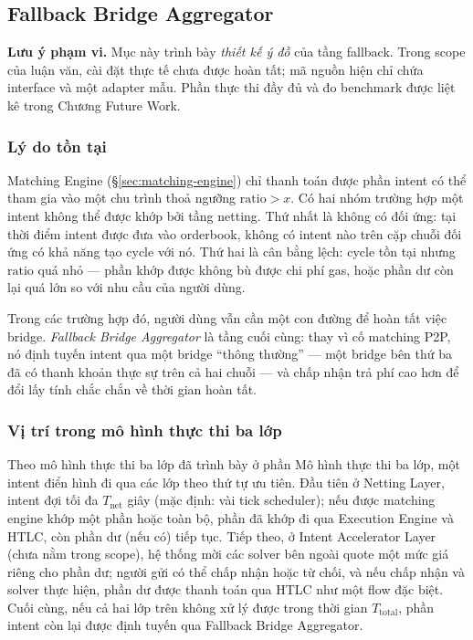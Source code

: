 
\subsection{Fallback Bridge Aggregator}
\label{sec:fallback-bridge}

\noindent\textbf{Lưu ý phạm vi.} Mục này trình bày \emph{thiết kế ý đồ} của tầng fallback. Trong scope của luận văn, cài đặt thực tế chưa được hoàn tất; mã nguồn hiện chỉ chứa interface và một adapter mẫu. Phần thực thi đầy đủ và đo benchmark được liệt kê trong Chương Future Work.

\subsubsection{Lý do tồn tại}

Matching Engine (\S\ref{sec:matching-engine}) chỉ thanh toán được phần intent có thể tham gia vào một chu trình thoả ngưỡng $\mathrm{ratio} > x$. Có hai nhóm trường hợp một intent không thể được khớp bởi tầng netting. Thứ nhất là không có đối ứng: tại thời điểm intent được đưa vào orderbook, không có intent nào trên cặp chuỗi đối ứng có khả năng tạo cycle với nó. Thứ hai là cân bằng lệch: cycle tồn tại nhưng $\mathrm{ratio}$ quá nhỏ — phần khớp được không bù được chi phí gas, hoặc phần dư còn lại quá lớn so với nhu cầu của người dùng.

Trong các trường hợp đó, người dùng vẫn cần một con đường để hoàn tất việc bridge. \emph{Fallback Bridge Aggregator} là tầng cuối cùng: thay vì cố matching P2P, nó định tuyến intent qua một bridge ``thông thường'' --- một bridge bên thứ ba đã có thanh khoản thực sự trên cả hai chuỗi --- và chấp nhận trả phí cao hơn để đổi lấy tính chắc chắn về thời gian hoàn tất.

\subsubsection{Vị trí trong mô hình thực thi ba lớp}

Theo mô hình thực thi ba lớp đã trình bày ở phần Mô hình thực thi ba lớp, một intent điển hình đi qua các lớp theo thứ tự ưu tiên. Đầu tiên ở Netting Layer, intent đợi tối đa $T_{\text{net}}$ giây (mặc định: vài tick scheduler); nếu được matching engine khớp một phần hoặc toàn bộ, phần đã khớp đi qua Execution Engine và HTLC, còn phần dư (nếu có) tiếp tục. Tiếp theo, ở Intent Accelerator Layer (chưa nằm trong scope), hệ thống mời các solver bên ngoài quote một mức giá riêng cho phần dư; người gửi có thể chấp nhận hoặc từ chối, và nếu chấp nhận và solver thực hiện, phần dư được thanh toán qua HTLC như một flow đặc biệt. Cuối cùng, nếu cả hai lớp trên không xử lý được trong thời gian $T_{\text{total}}$, phần intent còn lại được định tuyến qua Fallback Bridge Aggregator.

